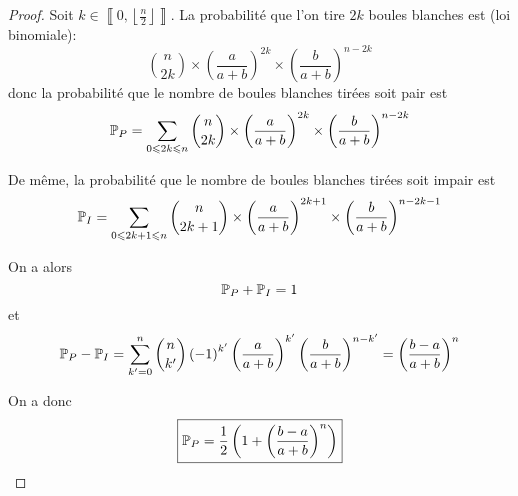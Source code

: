 \documentclass[12pt]{article}
\begin{document}
\begin{proof}
    Soit $k\in\left\llbracket0,\left\lfloor\frac{n}{2}\right\rfloor\right\rrbracket$. La probabilité que l'on tire $2k$ boules blanches est (loi binomiale):
    \begin{equation}
        \binom{n}{2k}\times\left(\frac{a}{a+b}\right)^{2k}\times\left(\frac{b}{a+b}\right)^{n-2k}
    \end{equation}
    donc la probabilité que le nombre de boules blanches tirées soit pair est 
    \begin{equation}
        \P_{P}=\sum_{0\leqslant 2k\leqslant n}\binom{n}{2k}\times\left(\frac{a}{a+b}\right)^{2k}\times\left(\frac{b}{a+b}\right)^{n-2k}
    \end{equation}
    
    De même, la probabilité que le nombre de boules blanches tirées soit impair est 
    \begin{equation}
        \P_{I}=\sum_{0\leqslant 2k+1\leqslant n}\binom{n}{2k+1}\times\left(\frac{a}{a+b}\right)^{2k+1}\times\left(\frac{b}{a+b}\right)^{n-2k-1}
    \end{equation}

    On a alors 
    \begin{equation}
        \P_{P}+\P_{I}=1
    \end{equation}
    et 
    \begin{equation}
        \P_{P}-\P_{I}=\sum_{k'=0}^{n}\binom{n}{k'}\left(-1\right)^{k'}\left(\frac{a}{a+b}\right)^{k'}\left(\frac{b}{a+b}\right)^{n-k'}=\left(\frac{b-a}{a+b}\right)^{n}
    \end{equation}

    On a donc 
    \begin{equation}
        \boxed{\P_{P}=\frac{1}{2}\left(1+\left(\frac{b-a}{a+b}\right)^{n}\right)}
    \end{equation}
\end{proof}
\end{document}
